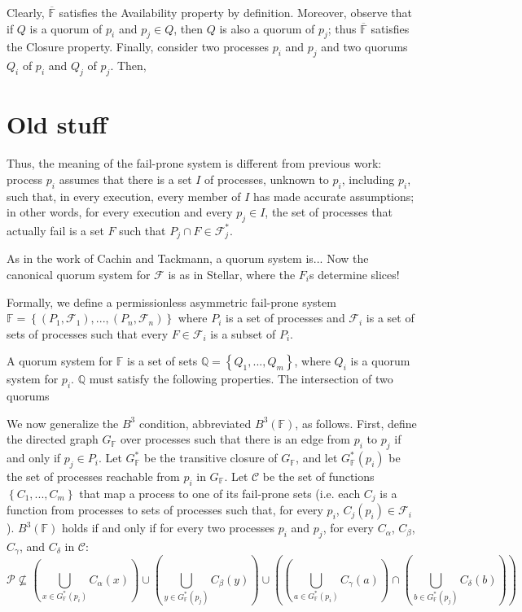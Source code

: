 \documentclass[11pt]{article}
\begin{document}
Clearly, $\overline{\mathbb{F}}$  satisfies the Availability property by definition. Moreover, observe that if $Q$ is a quorum of $p_i$ and $p_j\in Q$, then $Q$ is also a quorum of $p_j$; thus $\overline{\mathbb{F}}$ satisfies the Closure property. Finally, consider two processes $p_i$ and $p_j$ and two quorums $Q_i$ of $p_i$ and $Q_j$ of $p_j$. Then,

\section{Old stuff}


Thus, the meaning of the fail-prone system is different from previous work: process $p_i$ assumes that there is a set $I$ of processes, unknown to $p_i$, including $p_i$, such that, in every execution, every member of $I$ has made accurate assumptions; in other words, for every execution and every $p_j\in I$, the set of processes that actually fail is a set $F$ such that $P_j\cap F \in \mathcal{F}_j^*$.

As in the work of Cachin and Tackmann, a quorum system is... Now the canonical quorum system for $\mathcal{F}$ is as in Stellar, where the $F_i$s determine slices!

Formally, we define a permissionless asymmetric fail-prone system $\mathbb{F}=\left\{\left(P_1,\mathcal{F}_1\right),...,\left(P_n,\mathcal{F}_n\right)\right\}$ where $P_i$ is a set of processes and $\mathcal{F}_i$ is a set of sets of processes such that every $F\in\mathcal{F}_i$ is a subset of $P_i$.

A quorum system for $\mathbb{F}$ is a set of sets $\mathbb{Q}=\left\{Q_1,...,Q_m\right\}$, where $Q_i$ is a quorum system for $p_i$. $\mathbb{Q}$ must satisfy the following properties. The intersection of two quorums

  We now generalize the $B^3$ condition, abbreviated $B^3(\mathbb{F})$, as follows. First, define the directed graph $G_\mathbb{F}$ over processes such that there is an edge from $p_i$ to $p_j$ if and only if $p_j\in P_i$. Let $G_\mathbb{F}^*$ be the transitive closure of $G_\mathbb{F}$, and let $G_\mathbb{F}^*(p_i)$ be the set of processes reachable from $p_i$ in $G_\mathbb{F}$. Let $\mathcal{C}$ be the set of functions $\left\{C_1,...,C_m\right\}$ that map a process to one of its fail-prone sets (i.e. each $C_j$ is a function from processes to sets of processes such that, for every $p_i$, $C_j(p_i)\in \mathcal{F}_i$).
  $B^3(\mathbb{F})$ holds if and only if for every two processes $p_i$ and $p_j$, for every $C_\alpha$, $C_\beta$, $C_\gamma$, and $C_\delta$ in $\mathcal{C}$:
  \begin{equation}
    \mathcal{P}\not\subseteq \left(\bigcup_{x \in G_\mathbb{F}^*(p_i)}C_\alpha(x)\right) \cup \left(\bigcup_{y \in G_\mathbb{F}^*(p_j)}C_\beta(y)\right) \cup \left(\left(\bigcup_{a \in G_\mathbb{F}^*(p_i)}C_\gamma(a)\right) \cap \left(\bigcup_{b \in G_\mathbb{F}^*(p_j)}C_\delta(b)\right) \right)
  \end{equation}
\end{document}

